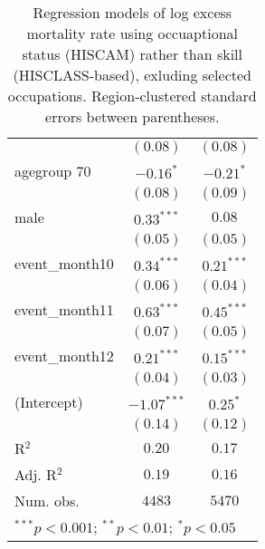 \begin{table}
\begin{center}
\begin{tabular}{l c c}
                     & $(0.08)$      & $(0.08)$      \\
agegroup 70          & $-0.16^{*}$   & $-0.21^{*}$   \\
                     & $(0.08)$      & $(0.09)$      \\
male                 & $0.33^{***}$  & $0.08$        \\
                     & $(0.05)$      & $(0.05)$      \\
event\_month10       & $0.34^{***}$  & $0.21^{***}$  \\
                     & $(0.06)$      & $(0.04)$      \\
event\_month11       & $0.63^{***}$  & $0.45^{***}$  \\
                     & $(0.07)$      & $(0.05)$      \\
event\_month12       & $0.21^{***}$  & $0.15^{***}$  \\
                     & $(0.04)$      & $(0.03)$      \\
(Intercept)          & $-1.07^{***}$ & $0.25^{*}$    \\
                     & $(0.14)$      & $(0.12)$      \\
\hline
R$^2$                & $0.20$        & $0.17$        \\
Adj. R$^2$           & $0.19$        & $0.16$        \\
Num. obs.            & $4483$        & $5470$        \\
\hline
\multicolumn{3}{l}{\scriptsize{$^{***}p<0.001$; $^{**}p<0.01$; $^{*}p<0.05$}}
\end{tabular}
\caption{Regression models of log excess mortality rate using occuaptional status (HISCAM) rather than skill (HISCLASS-based), exluding selected occupations. Region-clustered standard errors between parentheses.}
\label{tab:hiscammodels}
\end{center}
\end{table}

